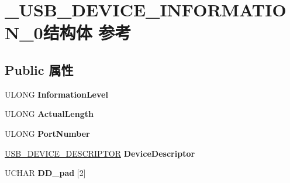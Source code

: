 \hypertarget{struct___u_s_b___d_e_v_i_c_e___i_n_f_o_r_m_a_t_i_o_n__0}{}\section{\+\_\+\+U\+S\+B\+\_\+\+D\+E\+V\+I\+C\+E\+\_\+\+I\+N\+F\+O\+R\+M\+A\+T\+I\+O\+N\+\_\+0结构体 参考}
\label{struct___u_s_b___d_e_v_i_c_e___i_n_f_o_r_m_a_t_i_o_n__0}
\subsection*{Public 属性}
\begin{DoxyCompactItemize}
\item 
\mbox{\label{struct___u_s_b___d_e_v_i_c_e___i_n_f_o_r_m_a_t_i_o_n__0_a5f671e5b708ab8695689499cb72592b2}} 
U\+L\+O\+NG {\bfseries Information\+Level}
\item 
\mbox{\label{struct___u_s_b___d_e_v_i_c_e___i_n_f_o_r_m_a_t_i_o_n__0_a33c246fe0b3f5a0bdf6b33ea3d3b6f86}} 
U\+L\+O\+NG {\bfseries Actual\+Length}
\item 
\mbox{\label{struct___u_s_b___d_e_v_i_c_e___i_n_f_o_r_m_a_t_i_o_n__0_ad11b73149e56410f2a945cf987422093}} 
U\+L\+O\+NG {\bfseries Port\+Number}
\item 
\mbox{\label{struct___u_s_b___d_e_v_i_c_e___i_n_f_o_r_m_a_t_i_o_n__0_a9fe884db0d0b930bccba96b227b5f747}} 
\hyperlink{struct___u_s_b___d_e_v_i_c_e___d_e_s_c_r_i_p_t_o_r}{U\+S\+B\+\_\+\+D\+E\+V\+I\+C\+E\+\_\+\+D\+E\+S\+C\+R\+I\+P\+T\+OR} {\bfseries Device\+Descriptor}
\item 
\mbox{\label{struct___u_s_b___d_e_v_i_c_e___i_n_f_o_r_m_a_t_i_o_n__0_a8eca4a406001a97e57c76846cb952c5f}} 
U\+C\+H\+AR {\bfseries D\+D\+\_\+pad} \mbox{[}2\mbox{]}
\item 
\mbox{\label{struct___u_s_b___d_e_v_i_c_e___i_n_f_o_r_m_a_t_i_o_n__0_ae3dc08ee02b6e2ae692e6c305dc9e469}} 

\end{DoxyCompactItemize}
